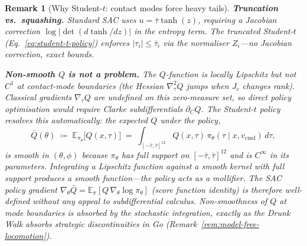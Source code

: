 \documentclass[11pt,a4paper]{article}
\newtheorem{remark}[theorem]{Remark}
\begin{document}
\begin{remark}[Why Student-$t$: contact modes force heavy tails]
\medskip\noindent
\textbf{Truncation vs.\ squashing.}\;
Standard SAC uses
$u = \bar\tau \tanh(z)$,
requiring a Jacobian correction
$\log\lvert\det(d\tanh/dz)\rvert$
in the entropy term.
The truncated Student-$t$
(Eq.~\eqref{eq:student-t-policy})
enforces $|\tau_i| \leq \bar\tau_i$
via the normaliser $Z_i$---no
Jacobian correction, exact bounds.

\medskip\noindent
\textbf{Non-smooth $Q$ is not a problem.}\;
The $Q$-function is locally Lipschitz
but \emph{not} $C^1$ at contact-mode
boundaries
(the Hessian $\nabla^2_\tau Q$
jumps when $J_c$ changes rank).
Classical gradients $\nabla_\tau Q$
are undefined on this zero-measure set,
so direct policy optimisation would require
Clarke subdifferentials
$\partial_C Q$.
The Student-$t$ policy resolves this
\emph{automatically}:
the expected $Q$ under the policy,
\[
  \bar Q(\theta)
  \;\coloneqq\;
  \mathbb{E}_{\pi_\theta}\!\bigl[Q(x, \tau)\bigr]
  \;=\;
  \int_{[-\bar\tau,\bar\tau]^{12}}
    \!\!Q(x, \tau)\,
    \pi_\theta(\tau \mid x, v_{\mathrm{cmd}})\,
    d\tau,
\]
is smooth in $(\theta, \phi)$
because $\pi_\theta$ has full support
on $[-\bar\tau, \bar\tau]^{12}$
and is $C^\infty$ in its parameters.
Integrating a Lipschitz function
against a smooth kernel
with full support
produces a smooth function---the
policy acts as a \emph{mollifier}.
The SAC policy gradient
$\nabla_\theta \bar Q
  = \mathbb{E}_\pi[Q\,\nabla_\theta\log\pi_\theta]$
(score function identity)
is therefore well-defined
without any appeal to subdifferential calculus.
Non-smoothness of $Q$
at mode boundaries is absorbed by the
stochastic integration,
exactly as the Drunk Walk absorbs
strategic discontinuities in Go
(Remark~\ref{rem:model-free-locomotion}).
\end{remark}
\end{document}
